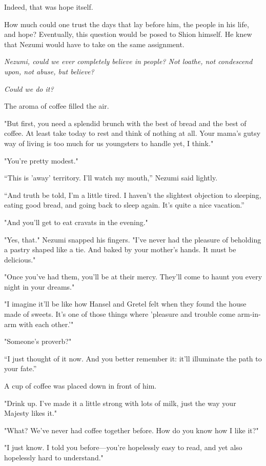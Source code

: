 Indeed, that was hope itself.

How much could one trust the days that lay before him, the people in his
life, and hope? Eventually, this question would be posed to Shion
himself. He knew that Nezumi would have to take on the same assignment.

\emph{Nezumi, could we ever completely believe in people? Not loathe, not
condescend upon, not abuse, but believe?}

\emph{Could we do it?}

The aroma of coffee filled the air.

"But first, you need a splendid brunch with the best of bread and the
best of coffee. At least take today to rest and think of nothing at all.
Your mama's gutsy way of living is too much for us youngsters to handle
yet, I think."

"You're pretty modest."

``This is 'away' territory. I'll watch my mouth,'' Nezumi said lightly.

``And truth be told, I'm a little tired. I haven't the slightest
objection to sleeping, eating good bread, and going back to sleep again.
It's quite a nice vacation.''

"And you'll get to eat cravats in the evening."

"Yes, that." Nezumi snapped his fingers. "I've never had the pleasure of
beholding a pastry shaped like a tie. And baked by your mother's hands.
It must be delicious."

"Once you've had them, you'll be at their mercy. They'll come to haunt
you every night in your dreams."

"I imagine it'll be like how Hansel and Gretel felt when they found the
house made of sweets. It's one of those things where 'pleasure and
trouble come arm-in-arm with each other.'"

"Someone's proverb?"

``I just thought of it now. And you better remember it: it'll illuminate
the path to your fate.''

A cup of coffee was placed down in front of him.

"Drink up. I've made it a little strong with lots of milk, just the way
your Majesty likes it."

"What? We've never had coffee together before. How do you know how I
like it?"

"I just know. I told you before---you're hopelessly easy to read, and yet
also hopelessly hard to understand."

